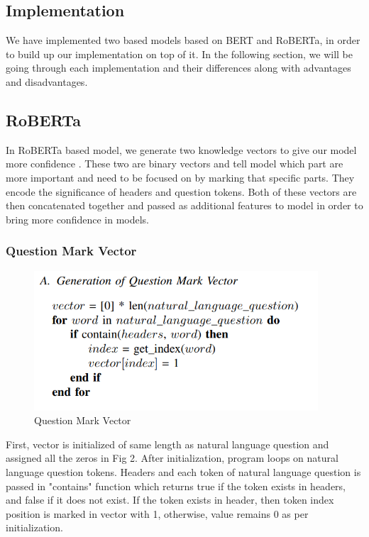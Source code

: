 \documentclass[12pt]{article}
\begin{document}
\subsection{Implementation}
We have implemented two based models based on BERT and RoBERTa, in order to build up our implementation on top of it. In the following section, we will be going through each implementation and their differences along with advantages and disadvantages. 

\subsection{RoBERTa}
In RoBERTa based model, we generate two knowledge vectors to give our model more confidence \cite{pal2021data}. These two are binary vectors and tell model which part are more important and need to be focused on by marking that specific parts. They encode the significance of headers and question tokens. Both of these vectors are then concatenated together and passed as additional features to model in order to bring more confidence in models. 


\subsubsection{Question Mark Vector}
\begin{figure}[H]
    \includegraphics[width=300pt]{QMV}
    \caption{Question Mark Vector}
    \label{fig:Question mark vector}
\end{figure}

First, vector is initialized of same length as natural language question and assigned all the zeros in Fig 2. After initialization, program loops on natural language question tokens. Headers and each token of natural language question is passed in "contains" function which returns true if the token exists in headers, and false if it does not exist. If the token exists in header, then token index position is marked in vector with 1, otherwise, value remains 0 as per initialization. 
\end{document}
